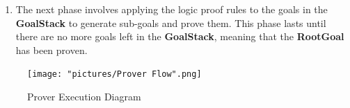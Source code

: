 \documentclass[12pt,a4paper]{article}
\begin{document}
{\begin{enumerate}
	This command will also populate the \textbf{ProvenGoals} list with axioms.
	\\
	
	Please note that the command is enclosed within parentheses, this being a requirement of Maude LOOP-MODE \cite{manual}. All the prover specific commands need to be enclosed in parenthesis. The previous command, \texttt{loop init .} was not enclosed because it is a Maude specific command, not something we want to pass as input to our prover.
	\item The next phase involves applying the logic proof rules to the goals in the \textbf{GoalStack} to generate sub-goals and prove them. This phase lasts until there are no more goals left in the \textbf{GoalStack}, meaning that the \textbf{RootGoal} has been proven.
\end{enumerate}
\begin{figure}[h]
	\texttt{[image: "pictures/Prover Flow".png]}
	\caption{Prover Execution Diagram}
	\label{fig:ProverDiagram}
\end{figure} 
\clearpage
}
\end{document}
